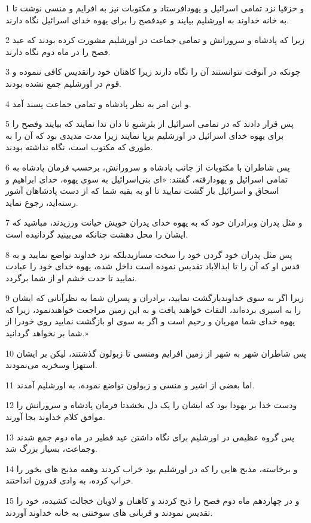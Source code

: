 \par 1 و حزقیا نزد تمامی اسرائیل و یهودافرستاد و مکتوبات نیز به افرایم و منسی نوشت تا به خانه خداوند به اورشلیم بیایند و عیدفصح را برای یهوه خدای اسرائیل نگاه دارند.
\par 2 زیرا که پادشاه و سرورانش و تمامی جماعت در اورشلیم مشورت کرده بودند که عید فصح را در ماه دوم نگاه دارند.
\par 3 چونکه در آنوقت نتوانستند آن را نگاه دارند زیرا کاهنان خود راتقدیس کافی ننموده و قوم در اورشلیم جمع نشده بودند.
\par 4 و این امر به نظر پادشاه و تمامی جماعت پسند آمد.
\par 5 پس قرار دادند که در تمامی اسرائیل از بئرشبع تا دان ندا نمایند که بیایند وفصح را برای یهوه خدای اسرائیل در اورشلیم برپا نمایند زیرا مدت مدیدی بود که آن را به طوری که مکتوب است، نگاه نداشته بودند.
\par 6 پس شاطران با مکتوبات از جانب پادشاه و سرورانش، برحسب فرمان پادشاه به تمامی اسرائیل و یهودارفته، گفتند: «ای بنی‌اسرائیل به سوی یهوه، خدای ابراهیم و اسحاق و اسرائیل باز گشت نمایید تا او به بقیه شما که از دست پادشاهان آشور رسته‌اید، رجوع نماید.
\par 7 و مثل پدران وبرادران خود که به یهوه خدای پدران خویش خیانت ورزیدند، مباشید که ایشان را محل دهشت چنانکه می‌بینید گردانیده است. 
\par 8 پس مثل پدران خود گردن خود را سخت مسازیدبلکه نزد خداوند تواضع نمایید و به قدس او که آن را تا ابدالاباد تقدیس نموده است داخل شده، یهوه خدای خود را عبادت نمایید تا حدت خشم او از شما برگردد.
\par 9 زیرا اگر به سوی خداوندبازگشت نمایید، برادران و پسران شما به نظرآنانی که ایشان را به اسیری برده‌اند، التفات خواهند یافت و به این زمین مراجعت خواهندنمود، زیرا که یهوه خدای شما مهربان و رحیم است و اگر به سوی او بازگشت نمایید روی خودرا از شما بر نخواهد گردانید.»
\par 10 پس شاطران شهر به شهر از زمین افرایم ومنسی تا زبولون گذشتند، لیکن بر ایشان استهزا وسخریه می‌نمودند.
\par 11 اما بعضی از اشیر و منسی و زبولون تواضع نموده، به اورشلیم آمدند.
\par 12 ودست خدا بر یهودا بود که ایشان را یک دل بخشدتا فرمان پادشاه و سرورانش را موافق کلام خداوند بجا آورند.
\par 13 پس گروه عظیمی در اورشلیم برای نگاه داشتن عید فطیر در ماه دوم جمع شدند وجماعت، بسیار بزرگ شد.
\par 14 و برخاسته، مذبح هایی را که در اورشلیم بود خراب کردند وهمه مذبح های بخور را خراب کرده، به وادی قدرون انداختند.
\par 15 و در چهاردهم ماه دوم فصح را ذبح کردند و کاهنان و لاویان خجالت کشیده، خود را تقدیس نمودند و قربانی های سوختنی به خانه خداوند آوردند.
